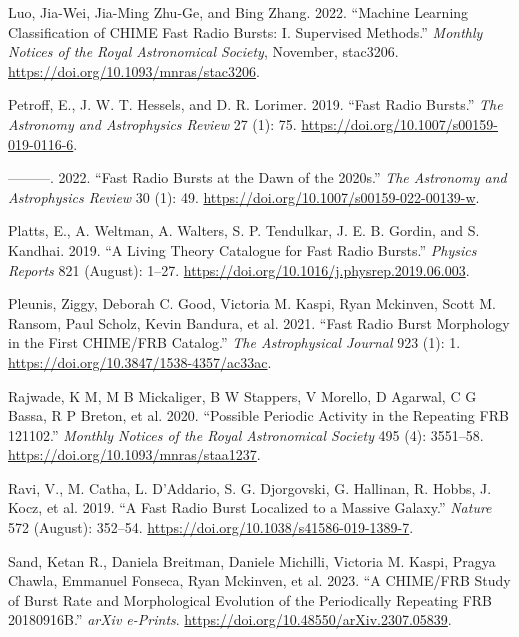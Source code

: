 \documentclass[
  rmp,
  amsmath,
  amssymb,
  preprint]{revtex4-2}
\newlength{\cslhangindent}
\newlength{\cslentryspacingunit} %
\newenvironment{CSLReferences}[2] %
 {%
  \setlength{\parindent}{0pt}
  \ifodd #1
  \let\oldpar\par
  \def\par{\hangindent=\cslhangindent\oldpar}
  \fi
  \setlength{\parskip}{#2\cslentryspacingunit}
 }%
 {}
\begin{document}
\begin{CSLReferences}{1}{0}
\leavevmode{}%
Luo, Jia-Wei, Jia-Ming Zhu-Ge, and Bing Zhang. 2022. {``Machine
{Learning Classification} of {CHIME} Fast Radio Bursts: {I}. {Supervised
Methods}.''} \emph{Monthly Notices of the Royal Astronomical Society},
November, stac3206. \url{https://doi.org/10.1093/mnras/stac3206}.

\leavevmode{}%
Petroff, E., J. W. T. Hessels, and D. R. Lorimer. 2019. {``Fast Radio
Bursts.''} \emph{The Astronomy and Astrophysics Review} 27 (1): 75.
\url{https://doi.org/10.1007/s00159-019-0116-6}.

\leavevmode{}%
---------. 2022. {``Fast Radio Bursts at the Dawn of the 2020s.''}
\emph{The Astronomy and Astrophysics Review} 30 (1): 49.
\url{https://doi.org/10.1007/s00159-022-00139-w}.

\leavevmode{}%
Platts, E., A. Weltman, A. Walters, S. P. Tendulkar, J. E. B. Gordin,
and S. Kandhai. 2019. {``A {Living Theory Catalogue} for {Fast Radio
Bursts}.''} \emph{Physics Reports} 821 (August): 1--27.
\url{https://doi.org/10.1016/j.physrep.2019.06.003}.

\leavevmode{}%
Pleunis, Ziggy, Deborah C. Good, Victoria M. Kaspi, Ryan Mckinven, Scott
M. Ransom, Paul Scholz, Kevin Bandura, et al. 2021. {``Fast {Radio Burst
Morphology} in the {First CHIME}/{FRB Catalog}.''} \emph{The
Astrophysical Journal} 923 (1): 1.
\url{https://doi.org/10.3847/1538-4357/ac33ac}.

\leavevmode{}%
Rajwade, K M, M B Mickaliger, B W Stappers, V Morello, D Agarwal, C G
Bassa, R P Breton, et al. 2020. {``Possible Periodic Activity in the
Repeating {FRB} 121102.''} \emph{Monthly Notices of the Royal
Astronomical Society} 495 (4): 3551--58.
\url{https://doi.org/10.1093/mnras/staa1237}.

\leavevmode{}%
Ravi, V., M. Catha, L. D'Addario, S. G. Djorgovski, G. Hallinan, R.
Hobbs, J. Kocz, et al. 2019. {``A Fast Radio Burst Localized to a
Massive Galaxy.''} \emph{Nature} 572 (August): 352--54.
\url{https://doi.org/10.1038/s41586-019-1389-7}.

\leavevmode{}%
Sand, Ketan R., Daniela Breitman, Daniele Michilli, Victoria M. Kaspi,
Pragya Chawla, Emmanuel Fonseca, Ryan Mckinven, et al. 2023. {``A
{CHIME}/{FRB} Study of Burst Rate and Morphological Evolution of the
Periodically Repeating {FRB 20180916B}.''} \emph{arXiv e-Prints}.
\url{https://doi.org/10.48550/arXiv.2307.05839}.


\end{CSLReferences}
\end{document}
